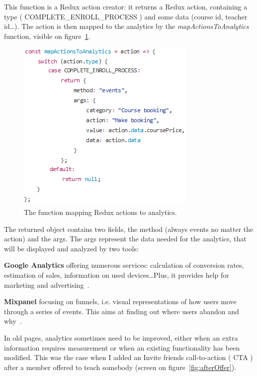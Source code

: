 This function is a Redux action creator: it returns a Redux action, containing a type (\guillemotleft{} COMPLETE\_ENROLL\_PROCESS \guillemotright{}) and some data (course id, teacher id\ldots). The action is then mapped to the analytics by the \textit{mapActionsToAnalytics} function, visible on {\sc figure}~\ref{fig:mapActions}.

\begin{figure}[H]
    \centering
    \includegraphics[scale=0.9]{figure/mapActions.png}
    \caption{The function mapping Redux actions to analytics.}
    \label{fig:mapActions}
\end{figure}

The returned object contains two fields, the method (always \guillemotleft{} events \guillemotright{} no matter the action) and the args. The args represent the data needed for the analytics, that will be displayed and analyzed by two tools:

\textbf{Google Analytics} offering numerous services: calculation of conversion rates, estimation of sales, information on used devices\ldots Plus, it provides help for marketing and advertising~\cite{googleAnalytics}.

\textbf{Mixpanel} focusing on funnels, i.e. visual representations of how users move through a series of events. This aims at finding out where users abandon and why~\cite{mixpanel}.

In old pages, analytics sometimes need to be improved, either when an extra information requires measurement or when an existing functionality has been modified. This was the case when I added an \guillemotleft{} Invite friends \guillemotright{} call-to-action (\guillemotleft{} CTA \guillemotright{}) after a member offered to teach somebody (screen on {\sc figure}~\ref{fig:afterOffer}).

